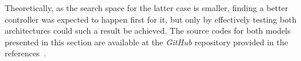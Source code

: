 	Theoretically, as the search space for the latter case is smaller, finding a better controller was expected to
	happen first for it, but only by effectively testing both architectures could such a result be achieved. The
	source codes for both models presented in this section are available at the \emph{GitHub} repository provided in
	the references~\cite{GitHub}.
	